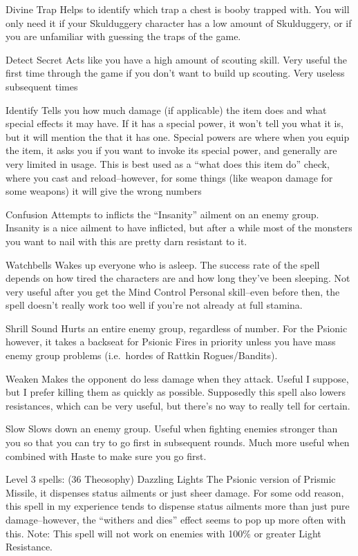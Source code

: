 \documentclass[12pt]{article}
\begin{document}
Divine Trap Helps to identify which trap a chest is booby trapped with.
You will only need it if your Skulduggery character has a low amount of
Skulduggery, or if you are unfamiliar with guessing the traps of the
game.

Detect Secret Acts like you have a high amount of scouting skill. Very
useful the first time through the game if you don't want to build up
scouting. Very useless subsequent times

Identify Tells you how much damage (if applicable) the item does and
what special effects it may have. If it has a special power, it won't
tell you what it is, but it will mention the that it has one. Special
powers are where when you equip the item, it asks you if you want to
invoke its special power, and generally are very limited in usage. This
is best used as a ``what does this item do'' check, where you cast and
reload--however, for some things (like weapon damage for some weapons)
it will give the wrong numbers

Confusion Attempts to inflicts the ``Insanity'' ailment on an enemy
group. Insanity is a nice ailment to have inflicted, but after a while
most of the monsters you want to nail with this are pretty darn
resistant to it.

Watchbells Wakes up everyone who is asleep. The success rate of the
spell depends on how tired the characters are and how long they've been
sleeping. Not very useful after you get the Mind Control Personal
skill--even before then, the spell doesn't really work too well if
you're not already at full stamina.

Shrill Sound Hurts an entire enemy group, regardless of number. For the
Psionic however, it takes a backseat for Psionic Fires in priority
unless you have mass enemy group problems (i.e.~hordes of Rattkin
Rogues/Bandits).

Weaken Makes the opponent do less damage when they attack. Useful I
suppose, but I prefer killing them as quickly as possible. Supposedly
this spell also lowers resistances, which can be very useful, but
there's no way to really tell for certain.

Slow Slows down an enemy group. Useful when fighting enemies stronger
than you so that you can try to go first in subsequent rounds. Much more
useful when combined with Haste to make sure you go first.

Level 3 spells: (36 Theosophy) Dazzling Lights The Psionic version of
Prismic Missile, it dispenses status ailments or just sheer damage. For
some odd reason, this spell in my experience tends to dispense status
ailments more than just pure damage--however, the ``withers and dies''
effect seems to pop up more often with this. Note: This spell will not
work on enemies with 100\% or greater Light Resistance.
\end{document}

